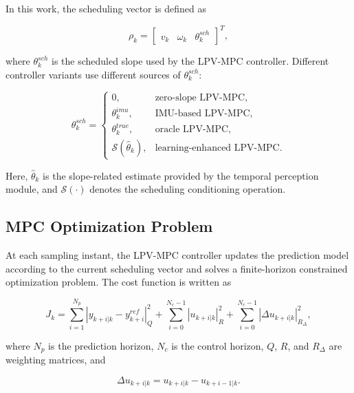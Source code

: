 \documentclass{ieeeaccess}
\begin{document}
In this work, the scheduling vector is defined as

\begin{equation}
\rho_k =
\begin{bmatrix}
v_k & \omega_k & \theta^{sch}_k
\end{bmatrix}^{T},
\label{eq:scheduling_vector}
\end{equation}

where $\theta^{sch}_k$ is the scheduled slope used by the LPV-MPC controller. Different controller variants use different sources of $\theta^{sch}_k$:

\begin{equation}
\theta^{sch}_k =
\begin{cases}
0, & \text{zero-slope LPV-MPC},\\
\theta^{imu}_k, & \text{IMU-based LPV-MPC},\\
\theta^{true}_k, & \text{oracle LPV-MPC},\\
\mathcal{S}(\hat{\theta}_k), & \text{learning-enhanced LPV-MPC}.
\end{cases}
\label{eq:theta_sources}
\end{equation}

Here, $\hat{\theta}_k$ is the slope-related estimate provided by the temporal perception module, and $\mathcal{S}(\cdot)$ denotes the scheduling conditioning operation.



\subsection{MPC Optimization Problem}



At each sampling instant, the LPV-MPC controller updates the prediction model according to the current scheduling vector and solves a finite-horizon constrained optimization problem. The cost function is written as

\begin{equation}
J_k =
\sum_{i=1}^{N_p}
\left|y_{k+i|k}-y^{ref}_{k+i}\right|_{Q}^{2}
+
\sum_{i=0}^{N_c-1}
\left|u_{k+i|k}\right|_{R}^{2}
+
\sum_{i=0}^{N_c-1}
\left|\Delta u_{k+i|k}\right|_{R_{\Delta}}^{2},
\label{eq:mpc_cost}
\end{equation}

where $N_p$ is the prediction horizon, $N_c$ is the control horizon, $Q$, $R$, and $R_{\Delta}$ are weighting matrices, and

\begin{equation}
\Delta u_{k+i|k}=u_{k+i|k}-u_{k+i-1|k}.
\label{eq:delta_u}
\end{equation}
\end{document}
